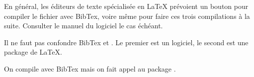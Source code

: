 En général, les éditeurs de texte spécialisée en \LaTeX{} prévoient un bouton pour compiler le fichier  avec BibTex, voire même pour faire ces trois compilations à la suite. Consulter le manuel du logiciel le cas échéant.

\begin{attention}

Il ne faut pas confondre BibTex et . Le premier est un logiciel, le second est une package de \LaTeX{}.

On compile avec BibTex mais on fait appel au package .

\end{attention}





